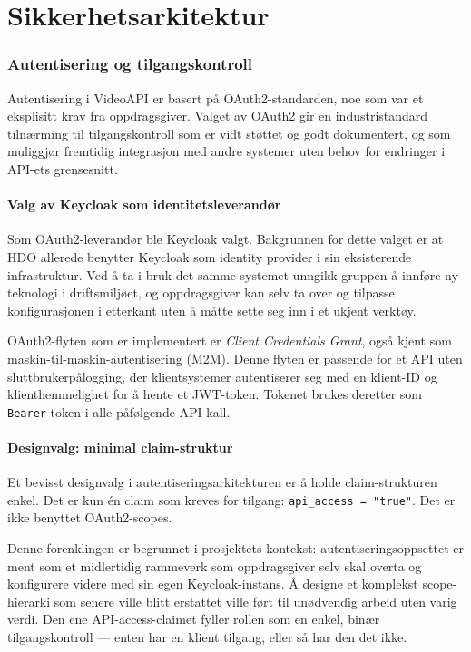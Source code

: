 \section{Sikkerhetsarkitektur}
\label{sec:design-sikkerhet}

\subsubsection{Autentisering og tilgangskontroll}

Autentisering i VideoAPI er basert på OAuth2-standarden, noe som var et eksplisitt krav fra oppdragsgiver. Valget av OAuth2 gir en industristandard tilnærming til tilgangskontroll som er vidt støttet og godt dokumentert, og som muliggjør fremtidig integrasjon med andre systemer uten behov for endringer i API-ets grensesnitt.

\paragraph{Valg av Keycloak som identitetsleverandør}

Som OAuth2-leverandør ble Keycloak valgt. Bakgrunnen for dette valget er at HDO allerede benytter Keycloak som identity provider i sin eksisterende infrastruktur. Ved å ta i bruk det samme systemet unngikk gruppen å innføre ny teknologi i driftsmiljøet, og oppdragsgiver kan selv ta over og tilpasse konfigurasjonen i etterkant uten å måtte sette seg inn i et ukjent verktøy.

OAuth2-flyten som er implementert er \textit{Client Credentials Grant}, også kjent som maskin-til-maskin-autentisering (M2M). Denne flyten er passende for et API uten sluttbrukerpålogging, der klientsystemer autentiserer seg med en klient-ID og klienthemmelighet for å hente et JWT-token. Tokenet brukes deretter som \texttt{Bearer}-token i alle påfølgende API-kall.

\paragraph{Designvalg: minimal claim-struktur}

Et bevisst designvalg i autentiseringsarkitekturen er å holde claim-strukturen enkel. Det er kun én claim som kreves for tilgang: \texttt{api\_access = "true"}. Det er ikke benyttet OAuth2-scopes.

Denne forenklingen er begrunnet i prosjektets kontekst: autentiseringsoppsettet er ment som et midlertidig rammeverk som oppdragsgiver selv skal overta og konfigurere videre med sin egen Keycloak-instans. Å designe et komplekst scope-hierarki som senere ville blitt erstattet ville ført til unødvendig arbeid uten varig verdi. Den ene API-access-claimet fyller rollen som en enkel, binær tilgangskontroll — enten har en klient tilgang, eller så har den det ikke.

